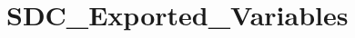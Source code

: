 \hypertarget{group___s_d_c___exported___variables}{}\section{S\+D\+C\+\_\+\+Exported\+\_\+\+Variables}
\label{group___s_d_c___exported___variables}
